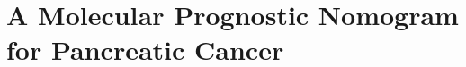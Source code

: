 \documentclass[dissertation.tex]{subfiles}
\begin{document}
\chapter{A Molecular Prognostic Nomogram for Pancreatic Cancer}
\label{chap:nomogram}
\end{document}
